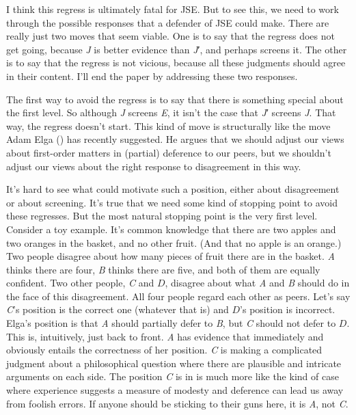 \documentclass[
  10pt,
  letterpaper,
  DIV=11,
  numbers=noendperiod,
  twoside]{scrartcl}
\begin{document}
I think this regress is ultimately fatal for JSE. But to see this, we
need to work through the possible responses that a defender of JSE could
make. There are really just two moves that seem viable. One is to say
that the regress does not get going, because \emph{J} is better evidence
than \emph{J}′, and perhaps screens it. The other is to say that the
regress is not vicious, because all these judgments should agree in
their content. I'll end the paper by addressing these two responses.

The first way to avoid the regress is to say that there is something
special about the first level. So although \emph{J} screens \emph{E}, it
isn't the case that \emph{J}′ screens \emph{J}. That way, the regress
doesn't start. This kind of move is structurally like the move Adam Elga
() has recently suggested. He argues
that we should adjust our views about first-order matters in (partial)
deference to our peers, but we shouldn't adjust our views about the
right response to disagreement in this way.

It's hard to see what could motivate such a position, either about
disagreement or about screening. It's true that we need some kind of
stopping point to avoid these regresses. But the most natural stopping
point is the very first level. Consider a toy example. It's common
knowledge that there are two apples and two oranges in the basket, and
no other fruit. (And that no apple is an orange.) Two people disagree
about how many pieces of fruit there are in the basket. \emph{A} thinks
there are four, \emph{B} thinks there are five, and both of them are
equally confident. Two other people, \emph{C} and \(D\), disagree about
what \emph{A} and \emph{B} should do in the face of this disagreement.
All four people regard each other as peers. Let's say \emph{C}'s
position is the correct one (whatever that is) and \(D\)'s position is
incorrect. Elga's position is that \emph{A} should partially defer to
\emph{B}, but \emph{C} should not defer to \(D\). This is, intuitively,
just back to front. \emph{A} has evidence that immediately and obviously
entails the correctness of her position. \emph{C} is making a
complicated judgment about a philosophical question where there are
plausible and intricate arguments on each side. The position \emph{C} is
in is much more like the kind of case where experience suggests a
measure of modesty and deference can lead us away from foolish errors.
If anyone should be sticking to their guns here, it is \emph{A}, not
\emph{C}.
\end{document}
